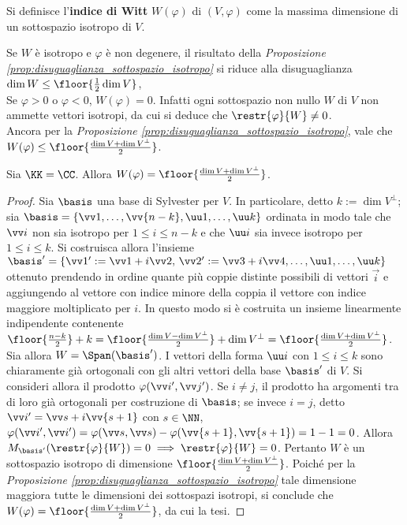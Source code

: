 \begin{definition}
	Si definisce l'\textbf{indice di Witt} $W(\varphi)$ di $(V, \varphi)$
	come la massima dimensione di un sottospazio isotropo di $V$. 
\end{definition}

\begin{remark}\nl
	\li Se $W$ è isotropo e $\varphi$ è non degenere, il risultato della \textit{Proposizione \ref{prop:disuguaglianza_sottospazio_isotropo}} si riduce alla disuguaglianza
	$\dim W \leq \floor{\frac{1}{2} \dim V}$, \\
	\li Se $\varphi > 0$ o $\varphi < 0$, $W(\varphi) = 0$. Infatti ogni sottospazio non nullo $W$ di $V$
	non ammette vettori isotropi, da cui si deduce che $\restr{\varphi}{W} \neq 0$. \\
	\li Ancora per la \textit{Proposizione \ref{prop:disuguaglianza_sottospazio_isotropo}}, vale che $W(\varphi) \leq \floor{\frac{\dim V + \dim V^\perp}{2}}$.
\end{remark}

\begin{proposition}
	Sia $\KK = \CC$. Allora
	$W(\varphi) = \floor{\frac{\dim V + \dim V^\perp}{2}}$.
\end{proposition}

\begin{proof}
	Sia $\basis$ una base di Sylvester per $V$. In particolare, detto $k := \dim V^\perp$; sia $\basis = \{ \vv 1, \ldots, \vv{n-k}, \uu 1, \ldots, \uu k \}$ ordinata in modo tale che $\vv i$ non
	sia isotropo per $1 \leq i \leq n-k$ e che $\uu i$ sia invece isotropo per
	$1 \leq i \leq k$. Si costruisca allora l'insieme $\basis' = \{\vv 1 ' := \vv 1 + i \vv 2, \, \vv 2 ' := \vv 3 + i \vv 4, \ldots, \uu 1, \ldots, \uu k\}$ ottenuto prendendo in ordine quante più coppie distinte possibili di
	vettori $\vec i$ e aggiungendo al vettore con indice minore della coppia il vettore
	con indice maggiore moltiplicato per $i$. In questo modo si è costruita un insieme linearmente indipendente
	contenente $\floor{\frac{n-k}{2}} + k = \floor{\frac{\dim V - \dim V^\perp}{2}} + \dim V^\perp = \floor{\frac{\dim V + \dim V^\perp}{2}}$. \\
	
	Sia allora $W = \Span(\basis')$. I vettori della forma $\uu i$ con $1 \leq i \leq k$ sono
	chiaramente già ortogonali con gli altri vettori della base $\basis'$ di $V$. Si consideri allora
	il prodotto $\varphi(\vv i', \vv j')$. Se $i \neq j$, il prodotto ha argomenti tra di
	loro già ortogonali per costruzione di $\basis$; se invece $i = j$, detto $\vv i' = \vv s + i \vv {s+1}$ con $s \in \NN$, $\varphi(\vv i', \vv i') = \varphi(\vv s, \vv s) - \varphi(\vv {s+1}, \vv {s+1}) = 1 - 1 = 0$. Allora $M_{\basis'}(\restr{\varphi}{W}) = 0 \implies \restr{\varphi}{W} = 0$. Pertanto $W$ è un sottospazio isotropo di dimensione
	$\floor{\frac{\dim V + \dim V^\perp}{2}}$. Poiché per la \textit{Proposizione \ref{prop:disuguaglianza_sottospazio_isotropo}} tale dimensione maggiora tutte le
	dimensioni dei sottospazi isotropi, si conclude che $W(\varphi) = \floor{\frac{\dim V + \dim V^\perp}{2}}$, da cui la tesi.
\end{proof}

